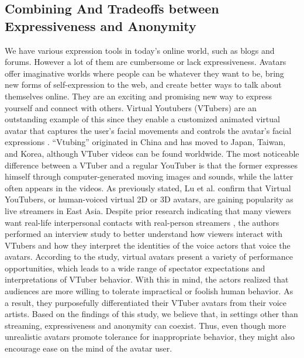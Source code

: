 \subsection{Combining And Tradeoffs between Expressiveness and Anonymity}
We have various expression tools in today's online world, such as blogs and forums. However a lot of them are cumbersome or lack expressiveness. Avatars offer imaginative worlds where people can be whatever they want to be, bring new forms of self-expression to the web, and create better ways to talk about themselves online. They are an exciting and promising new way to express yourself and connect with others. Virtual Youtubers (VTubers) are an outstanding example of this since they enable a customized animated virtual avatar that captures the user's facial movements and controls the avatar's facial expressions \cite{LU21}. “Vtubing” originated in China and has moved to Japan, Taiwan, and Korea, although VTuber videos can be found worldwide. The most noticeable difference between a VTuber and a regular YouTuber is that the former expresses himself through computer-generated moving images and sounds, while the latter often appears in the videos. As previously stated, Lu et al. \cite{LU21} confirm that Virtual YouTubers, or human-voiced virtual 2D or 3D avatars, are gaining popularity as live streamers in East Asia. Despite prior research indicating that many viewers want real-life interpersonal contacts with real-person streamers \cite{LU21, TUR22}, the authors performed an interview study to better understand how viewers interact with VTubers and how they interpret the identities of the voice actors that voice the avatars. According to the study, virtual avatars present a variety of performance opportunities, which leads to a wide range of spectator expectations and interpretations of VTuber behavior. With this in mind, the actors realized that audiences are more willing to tolerate impractical or foolish human behavior. As a result, they purposefully differentiated their VTuber avatars from their voice artists. Based on the findings of this study, we believe that, in settings other than streaming, expressiveness and anonymity can coexist. Thus, even though more unrealistic avatars promote tolerance for inappropriate behavior, they might also encourage ease on the mind of the avatar user.

